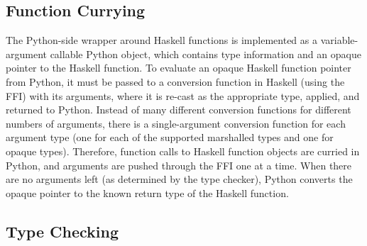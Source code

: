 \documentclass[11pt, letterpaper, oneside, twocolumn] {article}
\begin{document}
\subsection{Function Currying}\label{sec:imp_currying}

The Python-side wrapper around Haskell functions is implemented as a variable-argument callable Python object, which contains type information and an opaque pointer to the Haskell function.  To evaluate an opaque Haskell function pointer from Python, it must be passed to a conversion function in Haskell (using the FFI) with its arguments, where it is re-cast as the appropriate type, applied, and returned to Python.  Instead of many different conversion functions for different numbers of arguments, there is a single-argument conversion function for each argument type (one for each of the supported marshalled types and one for opaque types).  Therefore, function calls to Haskell function objects are curried in Python, and arguments are pushed through the FFI one at a time.  When there are no arguments left (as determined by the type checker), Python converts the opaque pointer to the known return type of the Haskell function.

\subsection{Type Checking}
\end{document}
